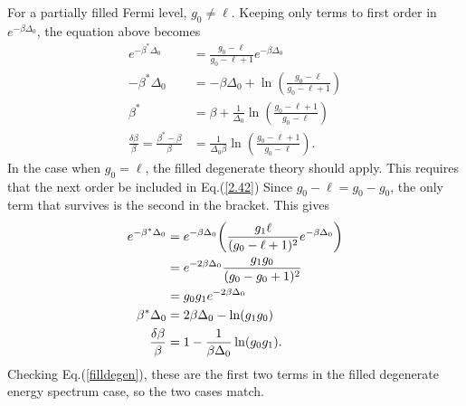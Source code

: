 For a partially filled Fermi level, $g_0\neq \ell$. Keeping only terms to first order in $e^{-\beta\Delta_0}$, the equation above becomes
\begin{align}
    e^{-\beta^*\Delta_0}&=\frac{g_0-\ell}{g_0-\ell+1} e^{-\beta\Delta_0}\nonumber\\
    -\beta^*\Delta_0&=-\beta\Delta_0+\ln(\frac{g_0-\ell}{g_0-\ell+1})\nonumber\\
    \beta^*&=\beta+\frac{1}{\Delta_0}\ln(\frac{g_0-\ell+1}{g_0-\ell})\nonumber\\
    \frac{\delta\beta}{\beta}=\frac{\beta^*-\beta}{\beta}&=\frac{1}{\Delta_0 \beta}\ln(\frac{g_0-\ell+1}{g_0-\ell}). \label{partfilldegen1}
\end{align}
In the case when $g_0=\ell$, the filled degenerate theory should apply. This requires that the next order be included in Eq.\@ (\ref{2.42}) Since $g_0-\ell=g_0-g_0$, the only term that survives is the second in the bracket. This gives
\begin{align}
    e^{-\beta^*\Delta_0}&= e^{-\beta\Delta_0} \qty(\frac{g_1 \ell}{(g_0-\ell+1)^2} e^{-\beta\Delta_0})\nonumber\\
    &=e^{-2\beta\Delta_0} \frac{g_1 g_0}{(g_0-g_0+1)^2}\nonumber\\
    &=g_0g_1e^{-2\beta\Delta_0}\nonumber\\
    \beta^*\Delta_0&=2\beta\Delta_0 - \ln(g_1g_0)\nonumber\\
    \frac{\delta\beta}{\beta}&=1-\frac{1}{\beta\Delta_0} \ln(g_0g_1). \label{partfilldegen}
\end{align}
Checking Eq.\@ (\ref{filldegen}), these are the first two terms in the filled degenerate energy spectrum case, so the two cases match. 
